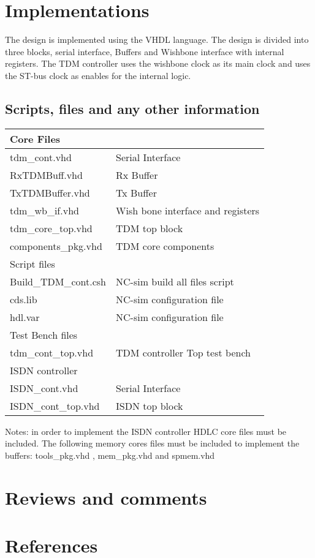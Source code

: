 \documentclass[a4paper,11pt]{article}
\begin{document}
\section{Implementations}

The  design is implemented using the VHDL language. The design is divided into three blocks, serial interface, Buffers and Wishbone interface with internal registers. The TDM controller uses the wishbone clock as its main clock and uses the ST-bus clock as enables for the internal logic.


\subsection{Scripts, files and any other information}
\begin{tabular}{|l|l|}
\hline
Core Files & \\
\hline
tdm\_cont.vhd & Serial Interface\\
RxTDMBuff.vhd & Rx Buffer\\
TxTDMBuffer.vhd & Tx Buffer\\
tdm\_wb\_if.vhd & Wish bone interface and registers\\
tdm\_core\_top.vhd & TDM top block\\
components\_pkg.vhd & TDM core components\\
\hline
Script files & \\
Build\_TDM\_cont.csh & NC-sim build all files script\\
cds.lib & NC-sim configuration file\\
hdl.var & NC-sim configuration file\\
\hline
Test Bench files & \\
tdm\_cont\_top.vhd & TDM controller Top test bench\\
\hline 
ISDN controller & \\
ISDN\_cont.vhd & Serial Interface\\
ISDN\_cont\_top.vhd & ISDN top block\\
\hline
\end{tabular}
Notes: in order to implement the ISDN controller HDLC core files must be included.
The following memory cores files must be included to implement the buffers: tools\_pkg.vhd , mem\_pkg.vhd and spmem.vhd

\section{Reviews and comments}

\section{References}
\end{document}
